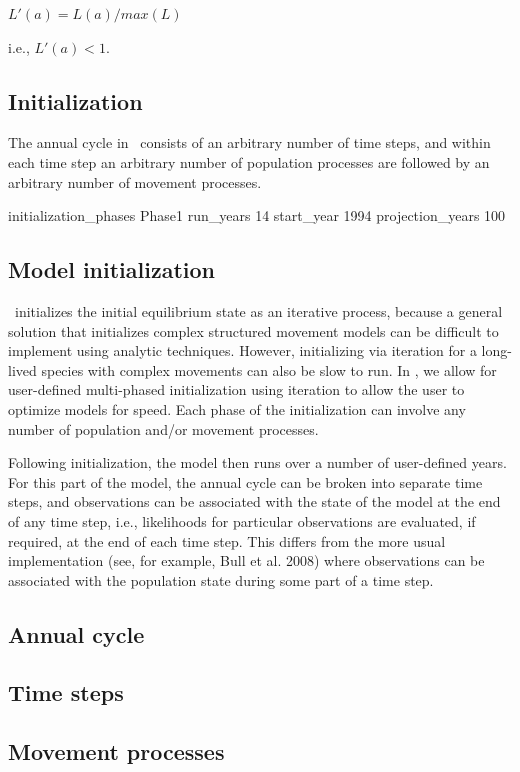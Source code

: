 $L'(a)=L(a)/max(L)$

i.e., $L'(a) < 1$.

\subsection{Initialization}

The annual cycle in \SPM\ consists of an arbitrary number of time steps, and within each time step an arbitrary number of population processes are followed by an arbitrary number of movement processes. 

initialization\_phases Phase1
run\_years 14
start\_year 1994
projection\_years 100

\subsection{Model initialization}

\SPM\ initializes the initial equilibrium state as an iterative process, because a general solution that initializes complex structured movement models can be difficult to implement using analytic techniques. However, initializing via iteration for a long-lived species with complex movements can also be slow to run. In \SPM, we allow for user-defined multi-phased initialization using iteration to allow the user to optimize models for speed. Each phase of the initialization can involve any number of population and/or movement processes. 

Following initialization, the model then runs over a number of user-defined years. For this part of the model, the annual cycle can be broken into separate time steps, and observations can be associated with the state of the model at the end of any time step, i.e., likelihoods for particular observations are evaluated, if required, at the end of each time step. This differs from the more usual implementation (see, for example, Bull et al. 2008) where observations can be associated with the population state during some part of a time step. 

\subsection{Annual cycle}

\subsection{Time steps}

\subsection{Movement processes}

